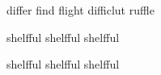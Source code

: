\documentclass{article}
\begin{document}
differ find flight difficlut ruffle

shelfful shelf{}ful shelf\/ful

shelfful shelfful shelfful
\end{document}
